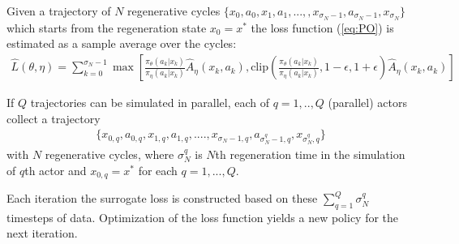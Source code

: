 \documentclass[11pt]{article}
\theoremstyle{definition}
\numberwithin{equation}{section}
\begin{document}
Given a trajectory of $N$ regenerative cycles $\{x_0, a_0, x_1, a_1, ..., , x_{\sigma_N-1}, a_{\sigma_N-1}, x_{\sigma_N}\}$ which starts from the regeneration state $x_0 = x^*$ the loss function (\ref{eq:PO}) is estimated as a sample average over the cycles:
 \begin{align*}
   \hat L(\theta, \eta) = \sum\limits_{k=0}^{\sigma_N-1} \max\left[ \frac{\pi_{\theta}(a_{k}| x_{k})}{\pi_{\eta}(a_{k}|x_{k})}  \hat A_{\eta}(x_{k}, a_{k}) ,\text{clip}\left(\frac{\pi_{\theta}(a_{k}| x_{k})}{\pi_{\eta}(a_{k}|x_{k})},     1-\epsilon, 1+\epsilon \right  ) \hat  A_{\eta}(x_{k}, a_{k})  \right]
   \end{align*}

If $Q$ trajectories can be simulated in parallel, each of $q=1, .., Q$ (parallel) actors collect a trajectory  \begin{align*}\{x_{0, q}, a_{0, q}, x_{1 , q}, a_{1, q}, ...., x_{\sigma_N-1, q}, a_{\sigma_N^q-1, q}, x_{\sigma_N^q, q}\}   \end{align*} with $N$ regenerative cycles, where $\sigma_N^q$  is $N$th regeneration time in the simulation of $q$th actor and $x_{0, q} = x^*$ for each $q=1, ..., Q$. 


Each iteration  the surrogate loss is constructed based on these $\sum\limits_{q=1}^Q \sigma_N^q$ timesteps of data. Optimization of the loss function yields a new policy for the next iteration.
\end{document}
